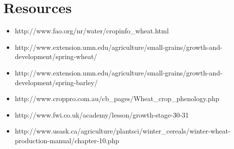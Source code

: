 \documentclass[a4paper,fleqn]{article}
\begin{document}
\section{Resources}

\begin{itemize}
\item http://www.fao.org/nr/water/cropinfo\_wheat.html
\item http://www.extension.umn.edu/agriculture/small-grains/growth-and-development/spring-wheat/
\item http://www.extension.umn.edu/agriculture/small-grains/growth-and-development/spring-barley/
\item http://www.croppro.com.au/cb\_pages/Wheat\_crop\_phenology.php
\item http://www.fwi.co.uk/academy/lesson/growth-stage-30-31
\item http://www.usask.ca/agriculture/plantsci/winter_cereals/winter-wheat-production-manual/chapter-10.php
\end{itemize}
\end{document}
